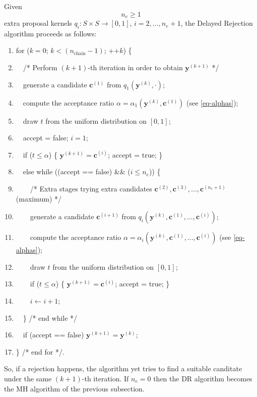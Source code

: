 Given
\begin{equation}\label{eq-Ne}
n_e\geqslant 1
\end{equation}
extra proposal kernels $q_i:S\times S\rightarrow [0,1]$, $i=2,\ldots,n_e+1$,
the Delayed Rejection algorithm proceeds as follows:
\begin{enumerate}
\item for ($k=0$; $k < (n_{\mbox{chain}}-1)$; ++$k$) \{
\item $\quad$/* Perform $(k+1)$-th iteration in order to obtain $\mathbf{y}^{(k+1)}$ */
\item $\quad$generate a candidate $\mathbf{c}^{(1)}$ from $q_1(\mathbf{y}^{(k)},\cdot)$;
\item $\quad$compute the acceptance ratio $\alpha=\alpha_1(\mathbf{y}^{(k)},\mathbf{c}^{(1)})$ (see \eqref{eq-alphas});
\item $\quad$draw $t$ from the uniform distribution on $[0,1]$;
\item $\quad$accept = false; $i=1$;
\item $\quad$if ($t\leqslant \alpha$) \{ $\mathbf{y}^{(k+1)}=\mathbf{c}^{(i)}$; accept = true; \}
\item $\quad$else while ((accept == false) \&\& ($i\leqslant n_e$)) \{
\item $\quad\quad$/* Extra stages trying extra candidates $\mathbf{c}^{(2)},\mathbf{c}^{(3)},\ldots,\mathbf{c}^{(n_e+1)}$ (maximum) */
\item $\quad\quad$generate a candidate $\mathbf{c}^{(i+1)}$ from $q_i(\mathbf{y}^{(k)},\mathbf{c}^{(1)},\ldots,\mathbf{c}^{(i)})$;
\item $\quad\quad$compute the acceptance ratio $\alpha=\alpha_i(\mathbf{y}^{(k)},\mathbf{c}^{(1)},\ldots,\mathbf{c}^{(i)})$ (see \eqref{eq-alphas});
\item $\quad\quad$draw $t$ from the uniform distribution on $[0,1]$;
\item $\quad\quad$if ($t\leqslant \alpha$) \{ $\mathbf{y}^{(k+1)}=\mathbf{c}^{(i)}$; accept = true; \}
\item $\quad\quad$$i\leftarrow i+1$;
\item $\quad$\} /* end while */
\item $\quad$if (accept == false) $\mathbf{y}^{(k+1)}=\mathbf{y}^{(k)}$;
\item \} /* end for */.
\end{enumerate}
So, if a rejection happens, the algorithm yet tries to find a suitable canditate under the same $(k+1)$-th iteration.
If $n_e=0$ then the DR algorithm becomes the MH algorithm of the previous subsection.

